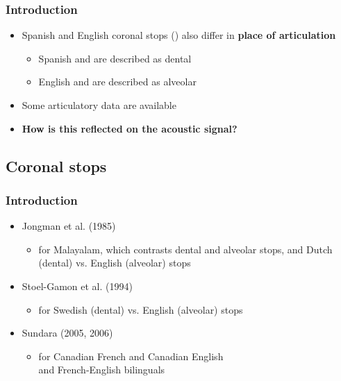 \documentclass{beamer}
\begin{document}
\begin{frame}
\frametitle{Introduction}
\begin{itemize}
	\item Spanish and English coronal stops () also differ in \textbf{place of articulation}
	\begin{itemize}
		\item Spanish  and  are described as dental
		\item English  and  are described as alveolar
	\end{itemize}
	\item Some articulatory data are available
	\item \textbf{How is this reflected on the acoustic signal?}
\end{itemize}
\end{frame}

\subsection{Coronal stops}

\begin{frame}
\frametitle{Introduction}
\begin{itemize}
	\item Jongman et al. (1985) \begin{itemize} \item for Malayalam, which contrasts dental and alveolar stops, and Dutch (dental) vs. English (alveolar) stops \end{itemize}
	\item Stoel-Gamon et al. (1994) \begin{itemize} \item for Swedish (dental) vs. English (alveolar) stops \end{itemize}
	\item Sundara (2005, 2006) \begin{itemize} \item for Canadian French and Canadian English \\ and French-English bilinguals \end{itemize}
\end{itemize}
\end{frame}
\end{document}
